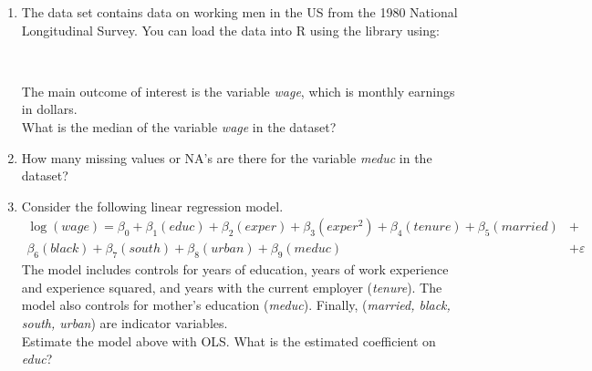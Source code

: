 \def\examid{26101200003}

\begin{enumerate}
\item {}
The data set  contains data on working men in the US from the 1980 National Longitudinal Survey. You can load the data into R using the  library using:

\medskip
{}\\
\medskip

The main outcome of interest is the variable \textit{wage}, which is monthly earnings in dollars.\\
What is the median of the variable \textit{wage} in the dataset?

\item How many missing values or NA's are there for the variable \textit{meduc} in the dataset?

\item Consider the following linear regression model.
\[\begin{aligned}
\log(wage) = \beta_0 + \beta_1(educ) + \beta_2(exper) + \beta_3(exper^2) + \beta_4(tenure) + \beta_5(married) &+ \\
\beta_6(black) + \beta_7(south) + \beta_8(urban) + \beta_9(meduc) &+ \varepsilon
\end{aligned}\]
The model includes controls for years of education, years of work experience and experience squared, and years with the current employer (\textit{tenure}). The model also controls for mother's education (\textit{meduc}). Finally, (\textit{married, black, south, urban}) are indicator variables.\\
Estimate the model above with OLS. What is the estimated coefficient on \textit{educ}?


\end{enumerate}

